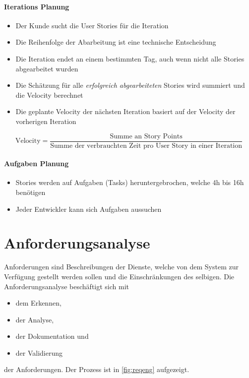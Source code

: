 				\paragraph{Iterations Planung}
					\begin{itemize}
						\item Der Kunde sucht die User Stories für die Iteration
						\item Die Reihenfolge der Abarbeitung ist eine technische Entscheidung
						\item Die Iteration endet an einem bestimmten Tag, auch wenn nicht alle Stories abgearbeitet wurden
						\item Die Schätzung für alle \textit{erfolgreich abgearbeiteten} Stories wird summiert und die Velocity berechnet
						\item Die geplante Velocity der nächsten Iteration basiert auf der Velocity der vorherigen Iteration
					\end{itemize}

					\begin{equation*}
						\text{Velocity} = \frac{\text{Summe an Story Points}}{\text{Summe der verbrauchten Zeit pro User Story in einer Iteration}}
					\end{equation*}

				\paragraph{Aufgaben Planung}
					\begin{itemize}
						\item Stories werden auf Aufgaben (Tasks) heruntergebrochen, welche 4h bis 16h benötigen
						\item Jeder Entwickler kann sich Aufgaben aussuchen
					\end{itemize}

	\section{Anforderungsanalyse}
		\label{sec:anforderungsanalyse}

		Anforderungen sind Beschreibungen der Dienste, welche von dem System zur Verfügung gestellt werden sollen und die Einschränkungen des selbigen. Die Anforderungsanalyse beschäftigt sich mit
		\begin{itemize}
			\item dem Erkennen,
			\item der Analyse,
			\item der Dokumentation und
			\item der Validierung
		\end{itemize}
		der Anforderungen. Der Prozess ist in \ref{fig:reqeng} aufgezeigt.

